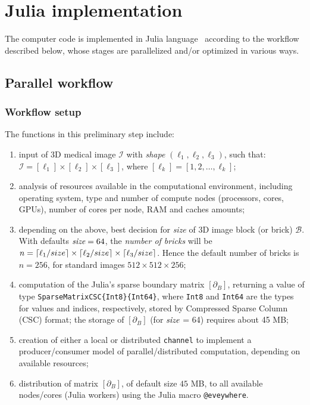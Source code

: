 \documentclass[11pt, oneside]{amsart}   	%
\begin{document}
%

\section{Julia implementation}\label{sec:julia}

The computer code is implemented in Julia language~\cite{BEKS14} according to the workflow described below, whose stages are parallelized and/or optimized in various ways.

\subsection{Parallel workflow}\label{sec:implementation}


\subsubsection*{Workflow setup}\label{sec:workflow}
The functions in this preliminary step include:
\begin{enumerate}

\item input of 3D medical image $\mathcal{I}$ with \emph{shape} $(\ell_1, \ell_2, \ell_3)$, such that: $\mathcal{I} = [\ell_1]\times[\ell_2]\times[\ell_3]$, where $[\ell_k] = [1,2,\ldots,\ell_k]$;

\item analysis of resources available in the computational environment, including operating system, type and number of compute nodes (processors, cores, GPUs), number of cores per node, RAM and caches amounts;

\item depending on the above, best decision for \emph{size} of 3D image block (or brick) $\mathcal{B}$. With defaults $\emph{size}=64$,  the \emph{number of bricks} will be $n=\left\lceil \ell_1/size \right\rceil\times\left\lceil \ell_2/size \right\rceil\times\left\lceil \ell_3/size \right\rceil$. 
Hence the default number of bricks is $n=256$, for standard images $512\times 512\times 256$;

\item computation of the Julia's sparse boundary matrix $[\partial_B]$, returning a value of type \texttt{SparseMatrixCSC\{Int8\}\{Int64\}}, where \texttt{Int8} and \texttt{Int64} are the types for values and indices, respectively, stored by Compressed Sparse Column (CSC) format; the storage of $[\partial_B]$ (for $\emph{size}$ = 64) requires about 45 MB;

\item creation of either a local or distributed \texttt{channel} to implement a producer/consumer model of parallel/distributed computation, depending on available resources;

\item distribution of matrix $[\partial_B]$, of default size $45$ MB, to all available nodes/cores (Julia workers) using the Julia macro \texttt{@eveywhere}. 

\end{enumerate}
\end{document}
